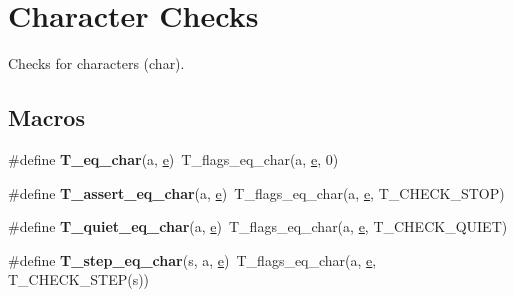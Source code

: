 \hypertarget{group__RTEMSTestFrameworkChecksChar}{}\section{Character Checks}
\label{group__RTEMSTestFrameworkChecksChar}


Checks for characters (char).  


\subsection*{Macros}
\begin{DoxyCompactItemize}
\item 
\mbox{\label{group__RTEMSTestFrameworkChecksChar_gaf65c7d0c5be8ad9196dbbae75e1961c8}} 
\#define {\bfseries T\+\_\+eq\+\_\+char}(a,  \mbox{\hyperlink{sun4u_2tte_8h_a8b0b9ed08e0e18920ec2682f48228c27}{e}})~T\+\_\+flags\+\_\+eq\+\_\+char(a, \mbox{\hyperlink{sun4u_2tte_8h_a8b0b9ed08e0e18920ec2682f48228c27}{e}}, 0)
\item 
\mbox{\label{group__RTEMSTestFrameworkChecksChar_ga15ca00a26248c50da02b2070cc7359d7}} 
\#define {\bfseries T\+\_\+assert\+\_\+eq\+\_\+char}(a,  \mbox{\hyperlink{sun4u_2tte_8h_a8b0b9ed08e0e18920ec2682f48228c27}{e}})~T\+\_\+flags\+\_\+eq\+\_\+char(a, \mbox{\hyperlink{sun4u_2tte_8h_a8b0b9ed08e0e18920ec2682f48228c27}{e}}, T\+\_\+\+C\+H\+E\+C\+K\+\_\+\+S\+T\+OP)
\item 
\mbox{\label{group__RTEMSTestFrameworkChecksChar_gaa4a5d9d52909cde05ee32c1951c61ad0}} 
\#define {\bfseries T\+\_\+quiet\+\_\+eq\+\_\+char}(a,  \mbox{\hyperlink{sun4u_2tte_8h_a8b0b9ed08e0e18920ec2682f48228c27}{e}})~T\+\_\+flags\+\_\+eq\+\_\+char(a, \mbox{\hyperlink{sun4u_2tte_8h_a8b0b9ed08e0e18920ec2682f48228c27}{e}}, T\+\_\+\+C\+H\+E\+C\+K\+\_\+\+Q\+U\+I\+ET)
\item 
\mbox{\label{group__RTEMSTestFrameworkChecksChar_ga9e8b1805daaab3876eef0a18d06cfb50}} 
\#define {\bfseries T\+\_\+step\+\_\+eq\+\_\+char}(s,  a,  \mbox{\hyperlink{sun4u_2tte_8h_a8b0b9ed08e0e18920ec2682f48228c27}{e}})~T\+\_\+flags\+\_\+eq\+\_\+char(a, \mbox{\hyperlink{sun4u_2tte_8h_a8b0b9ed08e0e18920ec2682f48228c27}{e}}, T\+\_\+\+C\+H\+E\+C\+K\+\_\+\+S\+T\+EP(s))

\end{DoxyCompactItemize}
